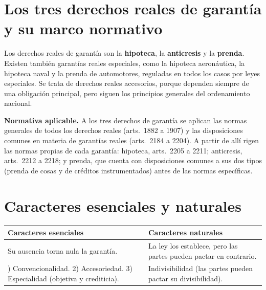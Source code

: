 \documentclass[12pt,oneside]{book}
\begin{document}
\section{Los tres derechos reales de garantía y su marco normativo}

Los derechos reales de garantía son la \textbf{hipoteca}, la \textbf{anticresis} y la \textbf{prenda}. Existen también garantías reales especiales, como la hipoteca aeronáutica, la hipoteca naval y la prenda de automotores, reguladas en todos los casos por leyes especiales. Se trata de derechos reales accesorios, porque dependen siempre de una obligación principal, pero siguen los principios generales del ordenamiento nacional.

\begin{importante}
\textbf{Normativa aplicable.} A los tres derechos de garantía se aplican las normas generales de todos los derechos reales (arts.~1882 a 1907) y las disposiciones comunes en materia de garantías reales (arts.~2184 a 2204). A partir de allí rigen las normas propias de cada garantía: hipoteca, arts.~2205 a 2211; anticresis, arts.~2212 a 2218; y prenda, que cuenta con disposiciones comunes a sus dos tipos (prenda de cosas y de créditos instrumentados) antes de las normas específicas.
\end{importante}

\section{Caracteres esenciales y naturales}

\begin{table}[H]
\centering
\begin{tabularx}{\textwidth}{@{}LL@{}}
\toprule
\textbf{Caracteres esenciales} & \textbf{Caracteres naturales} \\
\midrule
Su ausencia torna nula la garantía. & La ley los establece, pero las partes pueden pactar en contrario. \\
) Convencionalidad. 2) Accesoriedad. 3) Especialidad (objetiva y crediticia). & Indivisibilidad (las partes pueden pactar su divisibilidad). \\
\bottomrule
\end{tabularx}
\end{table}

\end{document}
